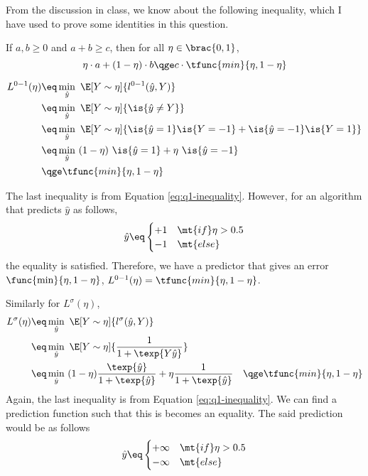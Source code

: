 \documentclass[a4paper,10pt]{article}
\begin{document}
\begin{question}

	\def\wy{\hat{y}}
	\def\sgn{\text{sign}}

	From the discussion in class, we know about the following inequality, which I have used to prove some identities in this question.

	If $a, b \ge 0$ and $a + b \ge c$, then for all $\eta \in \brac{0, 1}$,
	\begin{equation}
		\eta \cdot a + (1 - \eta) \cdot b	\qge	c \cdot \tfunc{min}{\eta, 1 - \eta}
		\label{eq:q1-inequality}
	\end{equation}

	\begin{qpart}{1}

		\begin{align*}
			L^{0-1}(\eta)	&\eq	\min_{\wy}\ \E[Y \sim \eta]{l^{0-1}(\wy, Y)} \\
			&\eq	\min_{\wy}\ \E[Y \sim \eta]{\is{\wy \ne Y}} \\
			&\eq	\min_{\wy}\ \E[Y \sim \eta]{\is{\wy = 1} \is{Y = -1} + \is{\wy = -1} \is{Y = 1}} \\
			&\eq	\min_{\wy}\ (1 - \eta)\ \is{\wy = 1} + \eta\ \is{\wy = -1} \\
			&\qge	\tfunc{min}{\eta, 1 - \eta}
		\end{align*}

		The last inequality is from Equation \ref{eq:q1-inequality}. However, for an algorithm that predicts $\wy$ as follows,
		\begin{align*}
			\wy	\eq	\begin{cases}
				+1	& \mt{if} \eta > 0.5 \\
				-1	& \mt{else}
			\end{cases}
		\end{align*}
		the equality is satisfied. Therefore, we have a predictor that gives an error $\func{\min}{\eta, 1 - \eta}$, \ie $L^{0-1}(\eta) = \tfunc{min}{\eta, 1 - \eta}$.

		Similarly for $L^{\sigma}(\eta)$,
		\begin{align*}
			L^{\sigma}(\eta)	&\eq	\min_{\wy}\ \E[Y \sim \eta]{l^{\sigma}(\wy, Y)} \\
			&\eq	\min_{\wy}\ \E[Y \sim \eta]{\frac{1}{1 + \texp{Y \wy}}} \\
			&\eq	\min_{\wy}\ (1 - \eta) \frac{\texp{\wy}}{1 + \texp{\wy}} + \eta \frac{1}{1 + \texp{\wy}}
			&\qge	\tfunc{min}{\eta, 1 - \eta}
		\end{align*}
		Again, the last inequality is from Equation \ref{eq:q1-inequality}. We can find a prediction function such that this is becomes an equality. The said prediction would be as follows
		\begin{align*}
			\wy	\eq	\begin{cases}
				+ \infty	& \mt{if} \eta > 0.5 \\
				- \infty	& \mt{else}
			\end{cases}
		\end{align*}


\end{qpart}
\end{question}
\end{document}
